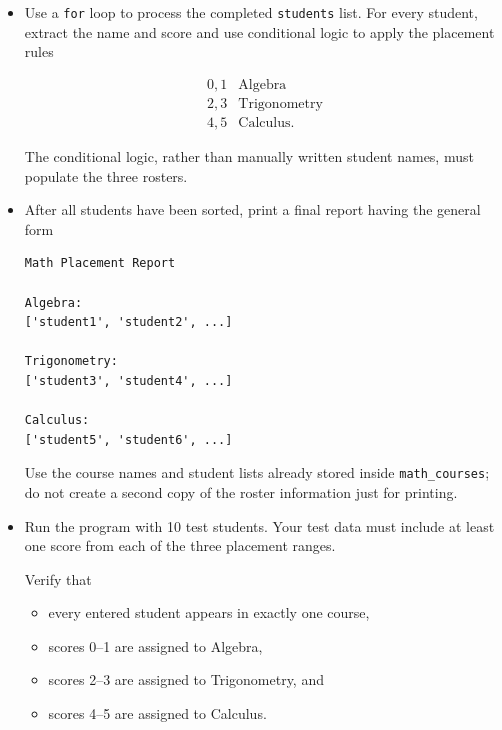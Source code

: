 \documentclass{article}
\begin{document}
\begin{enumerate}
\begin{itemize}
\begin{verbatim}
algebra = ["Algebra", []]

trigonometry = [
    "Trigonometry", []
]

calculus = ["Calculus", []]
\end{verbatim}

and combine them into

\begin{verbatim}
math_courses = (
    algebra,
    trigonometry,
    calculus
)
\end{verbatim}

\item Use a \texttt{for} loop to process the completed
\texttt{students} list.  For every student, extract the name
and score and use conditional logic to apply the placement
rules

\[
\begin{array}{c|c}
0,1 & \text{Algebra} \\
2,3 & \text{Trigonometry} \\
4,5 & \text{Calculus}.
\end{array}
\]

The conditional logic, rather than manually written student
names, must populate the three rosters.

\item After all students have been sorted, print a final
report having the general form

\begin{verbatim}
Math Placement Report

Algebra:
['student1', 'student2', ...]

Trigonometry:
['student3', 'student4', ...]

Calculus:
['student5', 'student6', ...]
\end{verbatim}

Use the course names and student lists already stored inside
\texttt{math\_courses}; do not create a second copy of the
roster information just for printing.

\item Run the program with 10 test students.  Your test data
must include at least one score from each of the three
placement ranges.

Verify that

\begin{itemize}
\item every entered student appears in exactly one course,
\item scores 0--1 are assigned to Algebra,
\item scores 2--3 are assigned to Trigonometry, and
\item scores 4--5 are assigned to Calculus.
\end{itemize}


\end{itemize}
\end{enumerate}
\end{document}
